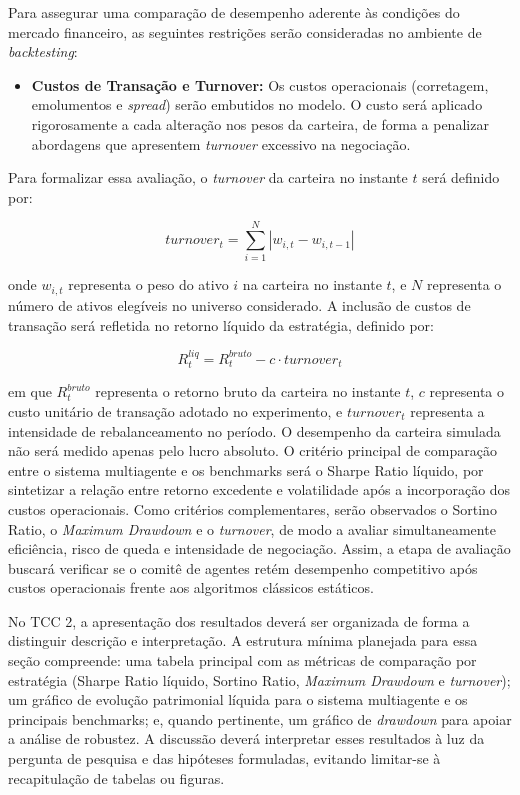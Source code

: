 \documentclass{eic-bcc-tcc}
\begin{document}
Para assegurar uma comparação de desempenho aderente às condições do mercado financeiro, as seguintes restrições serão consideradas no ambiente de \textit{backtesting}:

\begin{itemize}
    \item \textbf{Custos de Transação e Turnover:} Os custos operacionais (corretagem, emolumentos e \textit{spread}) serão embutidos no modelo. O custo será aplicado rigorosamente a cada alteração nos pesos da carteira, de forma a penalizar abordagens que apresentem \textit{turnover} excessivo na negociação.
\end{itemize}

Para formalizar essa avaliação, o \textit{turnover} da carteira no instante \(t\) será definido por:

\begin{equation}
\textit{turnover}_t = \sum_{i=1}^{N} |w_{i,t} - w_{i,t-1}|
\end{equation}

onde \(w_{i,t}\) representa o peso do ativo \(i\) na carteira no instante \(t\), e \(N\) representa o número de ativos elegíveis no universo considerado. A inclusão de custos de transação será refletida no retorno líquido da estratégia, definido por:

\begin{equation}
R^{liq}_t = R^{bruto}_t - c \cdot \textit{turnover}_t
\end{equation}

em que \(R^{bruto}_t\) representa o retorno bruto da carteira no instante \(t\), \(c\) representa o custo unitário de transação adotado no experimento, e \(\textit{turnover}_t\) representa a intensidade de rebalanceamento no período. O desempenho da carteira simulada não será medido apenas pelo lucro absoluto. O critério principal de comparação entre o sistema multiagente e os benchmarks será o Sharpe Ratio líquido, por sintetizar a relação entre retorno excedente e volatilidade após a incorporação dos custos operacionais. Como critérios complementares, serão observados o Sortino Ratio, o \textit{Maximum Drawdown} e o \textit{turnover}, de modo a avaliar simultaneamente eficiência, risco de queda e intensidade de negociação. Assim, a etapa de avaliação buscará verificar se o comitê de agentes retém desempenho competitivo após custos operacionais frente aos algoritmos clássicos estáticos.

No TCC 2, a apresentação dos resultados deverá ser organizada de forma a distinguir descrição e interpretação. A estrutura mínima planejada para essa seção compreende: uma tabela principal com as métricas de comparação por estratégia (Sharpe Ratio líquido, Sortino Ratio, \textit{Maximum Drawdown} e \textit{turnover}); um gráfico de evolução patrimonial líquida para o sistema multiagente e os principais benchmarks; e, quando pertinente, um gráfico de \textit{drawdown} para apoiar a análise de robustez. A discussão deverá interpretar esses resultados à luz da pergunta de pesquisa e das hipóteses formuladas, evitando limitar-se à recapitulação de tabelas ou figuras.
\end{document}
